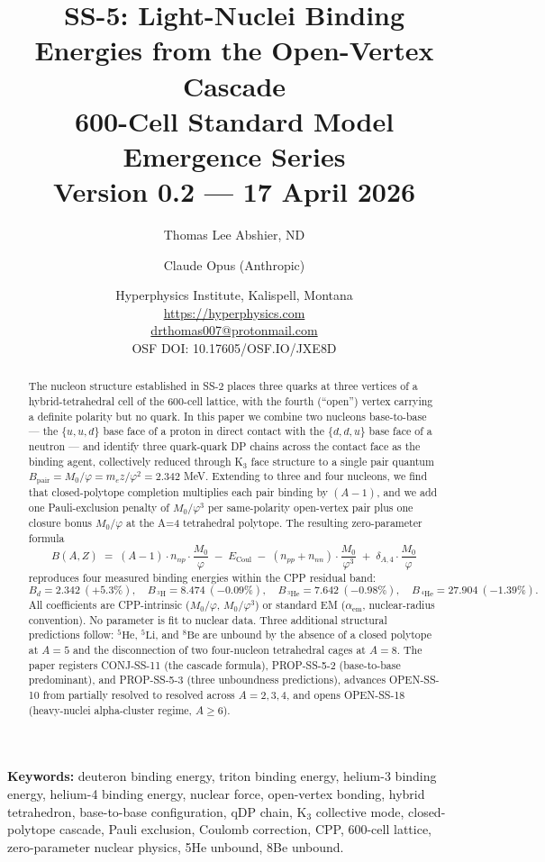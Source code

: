 \documentclass[11pt,letterpaper]{article}
\title{\textbf{SS-5: Light-Nuclei Binding Energies from the Open-Vertex Cascade}\\[6pt]
{\large 600-Cell Standard Model Emergence Series}\\[4pt]
{\normalsize Version 0.2 --- 17 April 2026}}
\author{Thomas Lee Abshier, ND \and Claude Opus (Anthropic)}
\date{\normalsize Hyperphysics Institute, Kalispell, Montana\\
\url{https://hyperphysics.com}\\
\href{mailto:drthomas007@protonmail.com}{drthomas007@protonmail.com}\\[4pt]
\small OSF DOI: 10.17605/OSF.IO/JXE8D}
\newcommand{\phig}{\varphi}
\newcommand{\Mzero}{M_0}
\newcommand{\Bpair}{B_{\mathrm{pair}}}
\newcommand{\Bd}{B_{d}}
\newcommand{\npnp}{n_{np}}
\newcommand{\npp}{n_{pp}}
\newcommand{\nnn}{n_{nn}}
\begin{document}
\maketitle

\begin{abstract}
The nucleon structure established in SS-2 places three quarks at three vertices of a hybrid-tetrahedral cell of the 600-cell lattice, with the fourth (``open'') vertex carrying a definite polarity but no quark. In this paper we combine two nucleons base-to-base --- the $\{u,u,d\}$ base face of a proton in direct contact with the $\{d,d,u\}$ base face of a neutron --- and identify three quark-quark DP chains across the contact face as the binding agent, collectively reduced through K$_3$ face structure to a single pair quantum $\Bpair = \Mzero/\phig = m_e z/\phig^2 = 2.342$ MeV. Extending to three and four nucleons, we find that closed-polytope completion multiplies each pair binding by $(A-1)$, and we add one Pauli-exclusion penalty of $\Mzero/\phig^3$ per same-polarity open-vertex pair plus one closure bonus $\Mzero/\phig$ at the A=4 tetrahedral polytope. The resulting zero-parameter formula
\[
B(A,Z) \;=\; (A-1)\cdot \npnp\cdot \frac{\Mzero}{\phig} \;-\; E_{\mathrm{Coul}} \;-\; (\npp+\nnn)\cdot\frac{\Mzero}{\phig^{3}} \;+\; \delta_{A,4}\cdot \frac{\Mzero}{\phig}
\]
reproduces four measured binding energies within the CPP residual band:
\[
\Bd = 2.342 ~(+5.3\%),\quad B_{\,^{3}\!\mathrm{H}} = 8.474 ~(-0.09\%),\quad B_{\,^{3}\!\mathrm{He}} = 7.642 ~(-0.98\%),\quad B_{\,^{4}\!\mathrm{He}} = 27.904 ~(-1.39\%).
\]
All coefficients are CPP-intrinsic ($\Mzero/\phig$, $\Mzero/\phig^{3}$) or standard EM ($\alpha_{\mathrm{em}}$, nuclear-radius convention). No parameter is fit to nuclear data. Three additional structural predictions follow: ${}^{5}\mathrm{He}$, ${}^{5}\mathrm{Li}$, and ${}^{8}\mathrm{Be}$ are unbound by the absence of a closed polytope at $A=5$ and the disconnection of two four-nucleon tetrahedral cages at $A=8$. The paper registers CONJ-SS-11 (the cascade formula), PROP-SS-5-2 (base-to-base predominant), and PROP-SS-5-3 (three unboundness predictions), advances OPEN-SS-10 from partially resolved to resolved across $A=2,3,4$, and opens OPEN-SS-18 (heavy-nuclei alpha-cluster regime, $A \geq 6$).
\end{abstract}

\medskip\noindent
\textbf{Keywords:} deuteron binding energy, triton binding energy, helium-3 binding energy, helium-4 binding energy, nuclear force, open-vertex bonding, hybrid tetrahedron, base-to-base configuration, qDP chain, K$_3$ collective mode, closed-polytope cascade, Pauli exclusion, Coulomb correction, CPP, 600-cell lattice, zero-parameter nuclear physics, 5He unbound, 8Be unbound.
\end{document}
